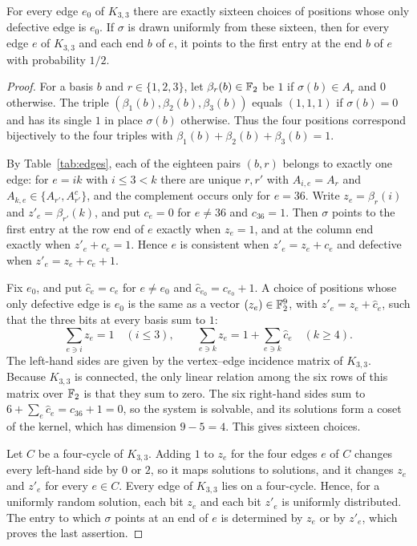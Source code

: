 \begin{lemma}\label{lem:one-defect}
For every edge $e_0$ of $K_{3,3}$ there are exactly sixteen choices of positions whose only defective edge is $e_0$. If $\sigma$ is drawn uniformly from these sixteen, then for every edge $e$ of $K_{3,3}$ and each end $b$ of $e$, it points to the first entry at the end $b$ of $e$ with probability $1/2$.
\end{lemma}
\begin{proof}
For a basis $b$ and $r\in\{1,2,3\}$, let $\beta_r(b)\in\mathbb F_2$ be $1$ if $\sigma(b)\in A_r$ and $0$ otherwise. The triple $(\beta_1(b),\beta_2(b),\beta_3(b))$ equals $(1,1,1)$ if $\sigma(b)=0$ and has its single $1$ in place $\sigma(b)$ otherwise. Thus the four positions correspond bijectively to the four triples with $\beta_1(b)+\beta_2(b)+\beta_3(b)=1$.

By Table~\ref{tab:edges}, each of the eighteen pairs $(b,r)$ belongs to exactly one edge: for $e=ik$ with $i\le3<k$ there are unique $r,r'$ with $A_{i,e}=A_r$ and $A_{k,e}\in\{A_{r'},A_{r'}^c\}$, and the complement occurs only for $e=36$. Write $z_e=\beta_r(i)$ and $z'_e=\beta_{r'}(k)$, and put $c_e=0$ for $e\ne36$ and $c_{36}=1$. Then $\sigma$ points to the first entry at the row end of $e$ exactly when $z_e=1$, and at the column end exactly when $z'_e+c_e=1$. Hence $e$ is consistent when $z'_e=z_e+c_e$ and defective when $z'_e=z_e+c_e+1$.

Fix $e_0$, and put $\hat c_e=c_e$ for $e\ne e_0$ and $\hat c_{e_0}=c_{e_0}+1$. A choice of positions whose only defective edge is $e_0$ is the same as a vector $(z_e)\in\mathbb F_2^9$, with $z'_e=z_e+\hat c_e$, such that the three bits at every basis sum to $1$:
\[
 \sum_{e\ni i}z_e=1\quad(i\le3),\qquad
 \sum_{e\ni k}z_e=1+\sum_{e\ni k}\hat c_e\quad(k\ge4).
\]
The left-hand sides are given by the vertex--edge incidence matrix of $K_{3,3}$. Because $K_{3,3}$ is connected, the only linear relation among the six rows of this matrix over $\mathbb F_2$ is that they sum to zero. The six right-hand sides sum to $6+\sum_e\hat c_e=c_{36}+1=0$, so the system is solvable, and its solutions form a coset of the kernel, which has dimension $9-5=4$. This gives sixteen choices.

Let $C$ be a four-cycle of $K_{3,3}$. Adding $1$ to $z_e$ for the four edges $e$ of $C$ changes every left-hand side by $0$ or $2$, so it maps solutions to solutions, and it changes $z_e$ and $z'_e$ for every $e\in C$. Every edge of $K_{3,3}$ lies on a four-cycle. Hence, for a uniformly random solution, each bit $z_e$ and each bit $z'_e$ is uniformly distributed. The entry to which $\sigma$ points at an end of $e$ is determined by $z_e$ or by $z'_e$, which proves the last assertion.
\end{proof}

